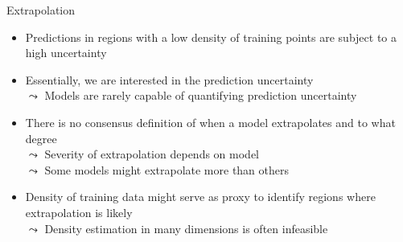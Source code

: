 \documentclass[11pt,compress,t,notes=noshow, aspectratio=169, xcolor=table]{beamer}
\begin{document}
\begin{frame}{Extrapolation}
\begin{itemize}
\item Predictions in regions with a low density of training points are subject to a high uncertainty
\item Essentially, we are interested in the prediction uncertainty\\
$\leadsto$ Models are rarely capable of quantifying prediction uncertainty
\item There is no consensus definition of when a model extrapolates and to what degree \\
$\leadsto$ Severity of extrapolation depends on model\\
$\leadsto$ Some models might extrapolate more than others
\item Density of training data might serve as proxy to identify regions where extrapolation is likely\\
$\leadsto$ Density estimation in many dimensions is often infeasible
\end{itemize}

\end{frame}


\end{document}
